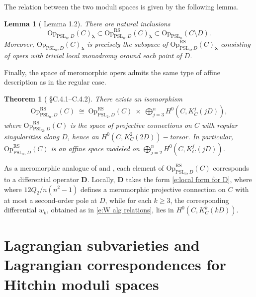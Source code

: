 \documentclass[twoside, 11pt]{article}
\numberwithin{equation}{section}
\theoremstyle{theorem}
\newtheorem{theorem}{Theorem}
\numberwithin{theorem}{section}
\newtheorem{lemma}[lemma]{Lemma}
\theoremstyle{definition}
\begin{document}
The relation between the two moduli spaces is given by the following lemma.
\begin{lemma}[\cite{Fr05} Lemma 1.2]\label{lem:global-apparent-mono}
There are natural inclusions
\[
\mathrm{Op}_{\mathrm{PSL}_n,D}(C)_{\boldsymbol{\check\lambda}}
\subset
\mathrm{Op}_{\mathrm{PSL}_n,D}^{\mathrm{RS}}(C)_{\boldsymbol{\check\lambda}}
\subset
\mathrm{Op}_{\mathrm{PSL}_n}(C\setminus D).
\]
Moreover,
\(
\mathrm{Op}_{\mathrm{PSL}_n,D}(C)_{\boldsymbol{\check\lambda}}
\)
is precisely the subspace of
\(
\mathrm{Op}_{\mathrm{PSL}_n,D}^{\mathrm{RS}}(C)_{\boldsymbol{\check\lambda}}
\)
consisting of opers with trivial local monodromy around each point of \(D\).
\end{lemma}


Finally, the space of meromorphic opers admits the same type of affine description as in the regular case.
\begin{theorem}[\cite{BD05} §C.4.1–C.4.2]\label{thm: singular oper space}
There exists an isomorphism 
\begin{align}\label{e:affine of oper}
\mathrm{Op}_{\mathrm{PSL}_n,D}^{\mathrm{RS}}(C)
  \;\cong\;
  \mathrm{Op}_{\mathrm{PSL}_2,D}^{\mathrm{RS}}(C)\;\times\;
  \bigoplus_{j=3}^n H^0\!\left(C, K_C^j(jD)\right),
\end{align}
where $\mathrm{Op}_{\mathrm{PSL}_2,D}^{\mathrm{RS}}(C)$ is the space of projective connections on $C$
with regular singularities along $D$, hence an $H^0(C,K_C^2(2D))-$torsor. In particular, $\mathrm{Op}_{\mathrm{PSL}_n,D}^{\mathrm{RS}}(C)$ is an affine space modeled on $\bigoplus_{j=2}^n H^0\!\left(C, K_C^j(jD)\right)$.
\end{theorem}

As a meromorphic analogue of  and , each element of \( \mathrm{Op}_{\mathrm{PSL}_n,D}^{\mathrm{RS}}(C) \) corresponds to a differential operator \( \mathbf{D} \). Locally, \(\mathbf{D}\) takes the form \eqref{e:local form for D}, where
where \(12 Q_2/n(n^2-1)\) defines a meromorphic projective connection on \( C \) with at most a second-order pole at \( D \), while for each \(k\ge 3\), the corresponding differential \(w_k\), obtained as in \eqref{e:W alg relations}, lies in \(H^0(C,K_C^k(kD))\).


\section{Lagrangian subvarieties and Lagrangian correspondences for Hitchin moduli spaces}
\end{document}
